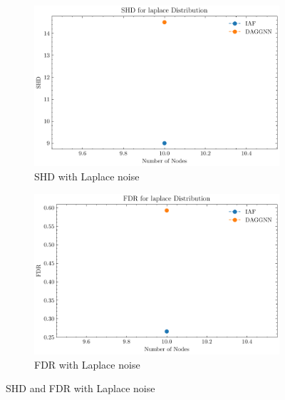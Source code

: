 \documentclass[10pt]{article}
\begin{document}
\begin{figure}[H]
    \centering
    \begin{subfigure}{0.45\textwidth}
        \includegraphics[width=\textwidth]{fig/SHD_independence_laplace.pdf}
        \caption{SHD with Laplace noise}
        \label{SHD_laplace}
    \end{subfigure}
    \hfill
    \begin{subfigure}{0.45\textwidth}
        \includegraphics[width=\textwidth]{fig/FDR_independence_laplace.pdf}
        \caption{FDR with Laplace noise}
        \label{FDR_laplace}
    \end{subfigure}
    \caption{SHD and FDR with Laplace noise}
    \label{SHD_FDR_laplace}
\end{figure}
\end{document}
